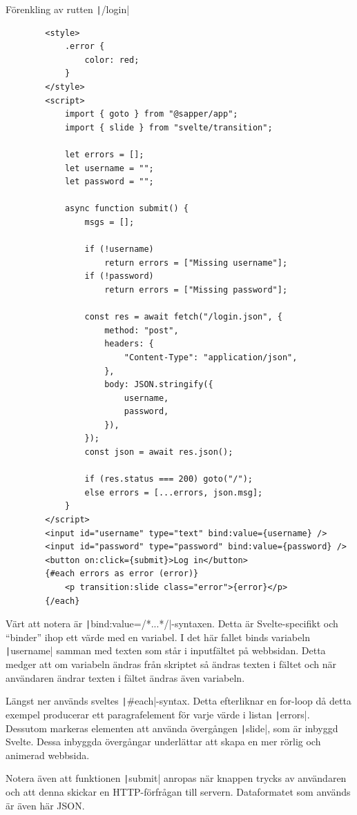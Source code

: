 \documentclass{article}
\begin{document}
\begin{listing}[H]
	\caption{Förenkling av rutten \texttt|/login|}
	\begin{verbatim}
		<style>
			.error {
				color: red;
			}
		</style>
		<script>
			import { goto } from "@sapper/app";
			import { slide } from "svelte/transition";

			let errors = [];
			let username = "";
			let password = "";

			async function submit() {
				msgs = [];

				if (!username)
					return errors = ["Missing username"];
				if (!password)
					return errors = ["Missing password"];

				const res = await fetch("/login.json", {
					method: "post",
					headers: {
						"Content-Type": "application/json",
					},
					body: JSON.stringify({
						username,
						password,
					}),
				});
				const json = await res.json();

				if (res.status === 200) goto("/");
				else errors = [...errors, json.msg];
			}
		</script>
		<input id="username" type="text" bind:value={username} />
		<input id="password" type="password" bind:value={password} />
		<button on:click={submit}>Log in</button>
		{#each errors as error (error)}
			<p transition:slide class="error">{error}</p>
		{/each}
	\end{verbatim}
\end{listing}

Värt att notera är
\texttt|bind:value={/*...*/}|-syntaxen. Detta är
Svelte-specifikt och ``binder'' ihop ett värde med en variabel. I det här fallet
binds variabeln \texttt|username| samman med texten som
står i inputfältet på webbsidan. Detta medger att om variabeln ändras från
skriptet så ändras texten i fältet och när användaren ändrar texten i fältet
ändras även variabeln.

Längst ner används sveltes \texttt|#each|-syntax. Detta
efterliknar en for-loop då detta exempel producerar ett paragrafelement för
varje värde i listan \texttt|errors|. Dessutom markeras
elementen att använda övergången \texttt|slide|, som är
inbyggd Svelte. Dessa inbyggda övergångar underlättar att skapa en mer
rörlig och animerad webbsida.

Notera även att funktionen \texttt|submit| anropas när
knappen trycks av användaren och att denna skickar en HTTP-förfrågan till
servern. Dataformatet som används är även här JSON.
\end{document}
